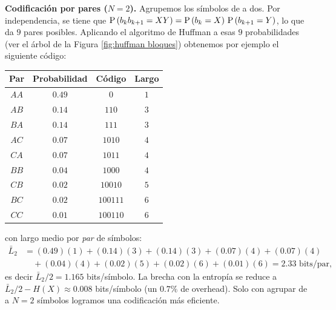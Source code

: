 \begin{ejemplo}
\textbf{Codificación por pares ($N=2$).} Agrupemos los símbolos de a dos. Por independencia, se tiene que $\mathrm{P}\left(b_k b_{k+1}=XY\right)=\mathrm{P}\left(b_k=X\right)\,\mathrm{P}\left(b_{k+1}=Y\right)$, lo que da $9$ pares posibles. Aplicando el algoritmo de Huffman a esas $9$ probabilidades (ver el árbol de la Figura \ref{fig:huffman bloques}) obtenemos por ejemplo el siguiente código:
\begin{center}
    \begin{tabular}{|c|c|c|c|}
        \hline
        Par & Probabilidad & Código & Largo \\
        \hline
        $AA$ & $0.49$ & $0$      & $1$ \\
        $AB$ & $0.14$ & $110$    & $3$ \\
        $BA$ & $0.14$ & $111$    & $3$ \\
        $AC$ & $0.07$ & $1010$   & $4$ \\
        $CA$ & $0.07$ & $1011$   & $4$ \\
        $BB$ & $0.04$ & $1000$   & $4$ \\
        $CB$ & $0.02$ & $10010$  & $5$ \\
        $BC$ & $0.02$ & $100111$ & $6$ \\
        $CC$ & $0.01$ & $100110$ & $6$ \\
        \hline
    \end{tabular}
\end{center}
con largo medio por \emph{par} de símbolos:
\begin{align*}
    \bar{L}_2 &= (0.49)(1)+(0.14)(3)+(0.14)(3)+(0.07)(4)+(0.07)(4)\\
    &\quad+(0.04)(4)+(0.02)(5)+(0.02)(6)+(0.01)(6) = 2.33 \text{ bits/par},
\end{align*}
es decir $\bar{L}_2/2 = 1.165$ bits/símbolo. La brecha con la entropía se reduce a $\bar{L}_2/2 - H(X)\approx 0.008$ bits/símbolo (un $0.7\%$ de overhead). Solo con agrupar de a $N=2$ símbolos logramos una codificación más eficiente.

\end{ejemplo}

